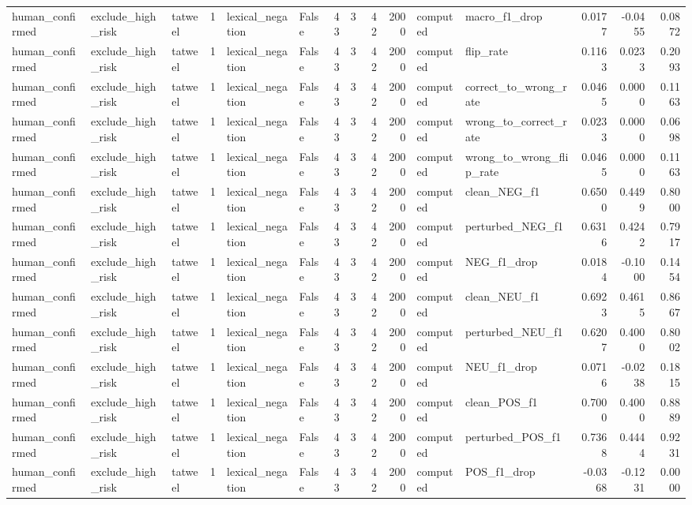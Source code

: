 \begin{tabular}{lllrllrrrrllrrr}
human_confirmed & exclude_high_risk & tatweel & 1 & lexical_negation & False & 43 & 3 & 42 & 2000 & computed & macro_f1_drop & 0.0177 & -0.0455 & 0.0872 \\
human_confirmed & exclude_high_risk & tatweel & 1 & lexical_negation & False & 43 & 3 & 42 & 2000 & computed & flip_rate & 0.1163 & 0.0233 & 0.2093 \\
human_confirmed & exclude_high_risk & tatweel & 1 & lexical_negation & False & 43 & 3 & 42 & 2000 & computed & correct_to_wrong_rate & 0.0465 & 0.0000 & 0.1163 \\
human_confirmed & exclude_high_risk & tatweel & 1 & lexical_negation & False & 43 & 3 & 42 & 2000 & computed & wrong_to_correct_rate & 0.0233 & 0.0000 & 0.0698 \\
human_confirmed & exclude_high_risk & tatweel & 1 & lexical_negation & False & 43 & 3 & 42 & 2000 & computed & wrong_to_wrong_flip_rate & 0.0465 & 0.0000 & 0.1163 \\
human_confirmed & exclude_high_risk & tatweel & 1 & lexical_negation & False & 43 & 3 & 42 & 2000 & computed & clean_NEG_f1 & 0.6500 & 0.4499 & 0.8000 \\
human_confirmed & exclude_high_risk & tatweel & 1 & lexical_negation & False & 43 & 3 & 42 & 2000 & computed & perturbed_NEG_f1 & 0.6316 & 0.4242 & 0.7917 \\
human_confirmed & exclude_high_risk & tatweel & 1 & lexical_negation & False & 43 & 3 & 42 & 2000 & computed & NEG_f1_drop & 0.0184 & -0.1000 & 0.1454 \\
human_confirmed & exclude_high_risk & tatweel & 1 & lexical_negation & False & 43 & 3 & 42 & 2000 & computed & clean_NEU_f1 & 0.6923 & 0.4615 & 0.8667 \\
human_confirmed & exclude_high_risk & tatweel & 1 & lexical_negation & False & 43 & 3 & 42 & 2000 & computed & perturbed_NEU_f1 & 0.6207 & 0.4000 & 0.8002 \\
human_confirmed & exclude_high_risk & tatweel & 1 & lexical_negation & False & 43 & 3 & 42 & 2000 & computed & NEU_f1_drop & 0.0716 & -0.0238 & 0.1815 \\
human_confirmed & exclude_high_risk & tatweel & 1 & lexical_negation & False & 43 & 3 & 42 & 2000 & computed & clean_POS_f1 & 0.7000 & 0.4000 & 0.8889 \\
human_confirmed & exclude_high_risk & tatweel & 1 & lexical_negation & False & 43 & 3 & 42 & 2000 & computed & perturbed_POS_f1 & 0.7368 & 0.4444 & 0.9231 \\
human_confirmed & exclude_high_risk & tatweel & 1 & lexical_negation & False & 43 & 3 & 42 & 2000 & computed & POS_f1_drop & -0.0368 & -0.1231 & 0.0000 \\

\end{tabular}

